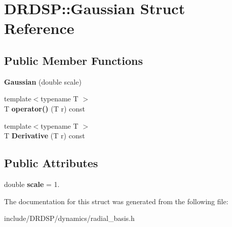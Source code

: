 \hypertarget{struct_d_r_d_s_p_1_1_gaussian}{\section{D\-R\-D\-S\-P\-:\-:Gaussian Struct Reference}
\label{struct_d_r_d_s_p_1_1_gaussian}
}
\subsection*{Public Member Functions}
\begin{DoxyCompactItemize}
\item 
\hypertarget{struct_d_r_d_s_p_1_1_gaussian_a3d61313f311f90c60eb62b018070639d}{{\bfseries Gaussian} (double scale)}\label{struct_d_r_d_s_p_1_1_gaussian_a3d61313f311f90c60eb62b018070639d}

\item 
\hypertarget{struct_d_r_d_s_p_1_1_gaussian_a1c0444ae1885798056899ca65f1f7c70}{{\footnotesize template$<$typename T $>$ }\\T {\bfseries operator()} (T r) const }\label{struct_d_r_d_s_p_1_1_gaussian_a1c0444ae1885798056899ca65f1f7c70}

\item 
\hypertarget{struct_d_r_d_s_p_1_1_gaussian_a2d44cfc87bff3ab7af32d69ad8d6dfa8}{{\footnotesize template$<$typename T $>$ }\\T {\bfseries Derivative} (T r) const }\label{struct_d_r_d_s_p_1_1_gaussian_a2d44cfc87bff3ab7af32d69ad8d6dfa8}

\end{DoxyCompactItemize}
\subsection*{Public Attributes}
\begin{DoxyCompactItemize}
\item 
\hypertarget{struct_d_r_d_s_p_1_1_gaussian_a54c0ec40d9295e0167e6216912f01d2a}{double {\bfseries scale} = 1.}\label{struct_d_r_d_s_p_1_1_gaussian_a54c0ec40d9295e0167e6216912f01d2a}

\end{DoxyCompactItemize}


The documentation for this struct was generated from the following file\-:\begin{DoxyCompactItemize}
\item 
include/\-D\-R\-D\-S\-P/dynamics/radial\-\_\-basis.\-h\end{DoxyCompactItemize}

